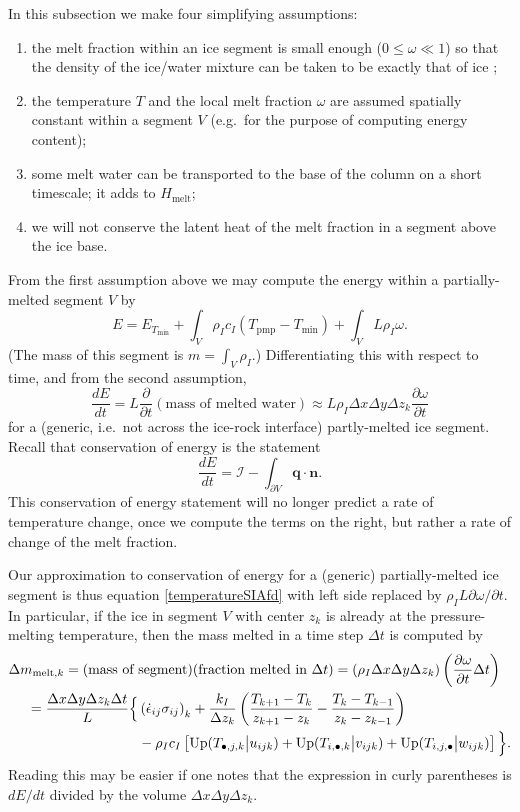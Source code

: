 \documentclass[12pt,final]{amsart}%
\theoremstyle{plain}
\theoremstyle{definition}
\theoremstyle{remark}
\newcommand{\DDt}[1]{\ensuremath{\frac{d #1}{d t}}}
\newcommand{\ddt}[1]{\ensuremath{\frac{\partial #1}{\partial t}}}
\def\eps{\epsilon}
\newcommand{\nhat}{\mathbf{n}}
\newcommand{\Up}{\ensuremath{\operatorname{Up}}}
\newcommand{\Tpmp}{T_{\text{pmp}}}
\newcommand{\bq}{{\mathbf{q}}}
\begin{document}
In this subsection we make four simplifying assumptions:\renewcommand{\labelenumi}{\emph{\roman{enumi}}) }
\begin{enumerate}
\item the melt fraction within an ice segment is small enough ($0\le \omega \ll 1$) so that the density of the ice/water mixture can be taken to be exactly that of ice \citep{Greve};
\item the temperature $T$ and the local melt fraction $\omega$ are assumed spatially constant within a segment $V$ (e.g.~for the purpose of computing energy content);
\item some melt water can be transported to the base of the column on a short timescale; it adds to $H_{\text{melt}}$;
\item we will not conserve the latent heat of the melt fraction in a segment above the ice base.
\end{enumerate}

From the first assumption above we may compute the energy within a partially-melted segment $V$ by
    $$E = E_{T_{\min}} + \int_V \rho_I c_I (\Tpmp-T_{\min}) + \int_V L \rho_I \omega.$$
(The mass of this segment is $m=\int_V \rho_I$.)  Differentiating this with respect to time, and from the second assumption,
\begin{equation*}
\DDt{E} = L \ddt{}\left(\text{mass of melted water}\right) \approx L \rho_I \Delta x\Delta y \Delta z_k \ddt{\omega}
\end{equation*}
for a (generic, i.e.~not across the ice-rock interface) partly-melted ice segment.  Recall that conservation of energy is the statement
    $$\DDt{E} = \mathcal{I} - \int_{\partial V} \bq \cdot \nhat.$$
This conservation of energy statement will no longer predict a rate of temperature change, once we compute the terms on the right, but rather a rate of change of the melt fraction.

Our approximation to conservation of energy for a (generic) partially-melted ice segment is thus equation \eqref{temperatureSIAfd} with left side replaced by $\rho_I L \partial\omega/\partial t$.  In particular, if the ice in segment $V$ with center $z_k$ is already at the pressure-melting temperature, then the mass melted in a time step $\Delta t$ is computed by
\begin{align}
\Delta m_{\text{melt},k} = (\text{mass of }&\text{segment})(\text{fraction melted in }\Delta t) = (\rho_I \Delta x\Delta y \Delta z_k)\left(\ddt{\omega}\Delta t\right) \label{massmelted} \\
    = \frac{\Delta x\Delta y \Delta z_k\Delta t}{L} \Big\{&\left(\dot\eps_{ij} \sigma_{ij}\right)_k + \frac{k_I}{\Delta z_k} \left(\frac{T_{k+1}-T_k}{z_{k+1}-z_k} - \frac{T_k-T_{k-1}}{z_k-z_{k-1}}\right) \notag\\
    &- \rho_I c_I \left[\Up(T_{\bullet,j,k} \big|u_{ijk}) + \Up(T_{i,\bullet,k} \big|v_{ijk}) + \Up(T_{i,j,\bullet} \big|w_{ijk})\right]\Big\}. \notag
\end{align}
Reading this may be easier if one notes that the expression in curly parentheses is $dE/dt$ divided by the volume $\Delta x\Delta y \Delta z_k$.
\end{document}
